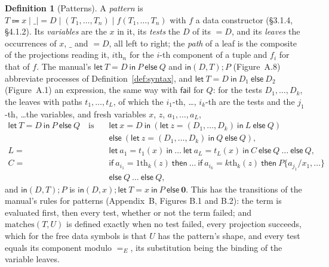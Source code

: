 \documentclass[11pt]{article}
\theoremstyle{definition}
\newtheorem{definition}{Definition}[section]
\theoremstyle{plain}
\theoremstyle{remark}
\begin{document}
\begin{definition}[Patterns]\label{def:patterns}
A \emph{pattern} is $T\Coloneqq x\mid\_\mid{=}D\mid(T_1,\dots,T_n)\mid f(T_1,\dots,T_n)$ with $f$ a data constructor (\S3.1.4, \S4.1.2). Its \emph{variables} are the $x$ in it, its \emph{tests} the $D$ of its ${=}D$, and its \emph{leaves} the occurrences of $x$, $\_$ and ${=}D$, all left to right; the \emph{path} of a leaf is the composite of the projections reading it, $i\mathrm{th}_n$ for the $i$-th component of a tuple and $f_i$ for that of $f$. The manual's $\mathsf{let}\ T=D\ \mathsf{in}\ P\ \mathsf{else}\ Q$ and $\mathsf{in}(D,T);P$ (Figure~A.8) abbreviate processes of Definition~\ref{def:syntax}, and $\mathsf{let}\ T=D\ \mathsf{in}\ D_1\ \mathsf{else}\ D_2$ (Figure~A.1) an expression, the same way with $\mathsf{fail}$ for $Q$: for the tests $D_1,\dots,D_k$, the leaves with paths $t_1,\dots,t_L$, of which the $i_1$-th, \dots, $i_k$-th are the tests and the $j_1$-th, \dots the variables, and fresh variables $x$, $z$, $a_1,\dots,a_L$,
\begin{align*}
\mathsf{let}\ T=D\ \mathsf{in}\ P\ \mathsf{else}\ Q\quad\text{is}\quad&\mathsf{let}\ x=D\ \mathsf{in}\ (\mathsf{let}\ z=(D_1,\dots,D_k)\ \mathsf{in}\ L\ \mathsf{else}\ Q)\\
&\mathsf{else}\ (\mathsf{let}\ z=(D_1,\dots,D_k)\ \mathsf{in}\ Q\ \mathsf{else}\ Q),\\
L=\ &\mathsf{let}\ a_1=t_1(x)\ \mathsf{in}\ \dots\ \mathsf{let}\ a_L=t_L(x)\ \mathsf{in}\ C\ \mathsf{else}\ Q\ \dots\ \mathsf{else}\ Q,\\
C=\ &\mathsf{if}\ a_{i_1}=1\mathrm{th}_k(z)\ \mathsf{then}\ \dots\ \mathsf{if}\ a_{i_k}=k\mathrm{th}_k(z)\ \mathsf{then}\ P\{a_{j_1}/x_1,\dots\}\\
&\mathsf{else}\ Q\ \dots\ \mathsf{else}\ Q,
\end{align*}
and $\mathsf{in}(D,T);P$ is $\mathsf{in}(D,x);\mathsf{let}\ T=x\ \mathsf{in}\ P\ \mathsf{else}\ \mathbf{0}$. This has the transitions of the manual's rules for patterns (Appendix~B, Figures B.1 and B.2): the term is evaluated first, then every test, whether or not the term failed; and $\mathrm{matches}(T,U)$ is defined exactly when no test failed, every projection succeeds, which for the free data symbols is that $U$ has the pattern's shape, and every test equals its component modulo $=_E$, its substitution being the binding of the variable leaves.
\end{definition}
\end{document}
